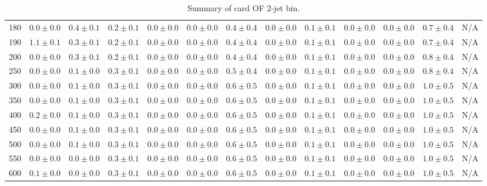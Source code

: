 \begin{table}
{\begin{center}
\begin{tabular}{l | c c | c c c c c c c c  | c c}
180 & $0.0\pm0.0$ & $0.4\pm0.1$ & $0.2\pm0.1$ & $0.0\pm0.0$ & $0.0\pm0.0$ & $0.4\pm0.4$ & $0.0\pm0.0$ & $0.1\pm0.1$ & $0.0\pm0.0$ & $0.0\pm0.0$ & $0.7\pm0.4$ & N/A \\
190 & $1.1\pm0.1$ & $0.3\pm0.1$ & $0.2\pm0.1$ & $0.0\pm0.0$ & $0.0\pm0.0$ & $0.4\pm0.4$ & $0.0\pm0.0$ & $0.1\pm0.1$ & $0.0\pm0.0$ & $0.0\pm0.0$ & $0.7\pm0.4$ & N/A \\
200 & $0.0\pm0.0$ & $0.3\pm0.1$ & $0.2\pm0.1$ & $0.0\pm0.0$ & $0.0\pm0.0$ & $0.4\pm0.4$ & $0.0\pm0.0$ & $0.1\pm0.1$ & $0.0\pm0.0$ & $0.0\pm0.0$ & $0.8\pm0.4$ & N/A \\
250 & $0.0\pm0.0$ & $0.1\pm0.0$ & $0.3\pm0.1$ & $0.0\pm0.0$ & $0.0\pm0.0$ & $0.5\pm0.4$ & $0.0\pm0.0$ & $0.1\pm0.1$ & $0.0\pm0.0$ & $0.0\pm0.0$ & $0.8\pm0.4$ & N/A \\
300 & $0.0\pm0.0$ & $0.1\pm0.0$ & $0.3\pm0.1$ & $0.0\pm0.0$ & $0.0\pm0.0$ & $0.6\pm0.5$ & $0.0\pm0.0$ & $0.1\pm0.1$ & $0.0\pm0.0$ & $0.0\pm0.0$ & $1.0\pm0.5$ & N/A \\
350 & $0.0\pm0.0$ & $0.1\pm0.0$ & $0.3\pm0.1$ & $0.0\pm0.0$ & $0.0\pm0.0$ & $0.6\pm0.5$ & $0.0\pm0.0$ & $0.1\pm0.1$ & $0.0\pm0.0$ & $0.0\pm0.0$ & $1.0\pm0.5$ & N/A \\
400 & $0.2\pm0.0$ & $0.1\pm0.0$ & $0.3\pm0.1$ & $0.0\pm0.0$ & $0.0\pm0.0$ & $0.6\pm0.5$ & $0.0\pm0.0$ & $0.1\pm0.1$ & $0.0\pm0.0$ & $0.0\pm0.0$ & $1.0\pm0.5$ & N/A \\
450 & $0.0\pm0.0$ & $0.1\pm0.0$ & $0.3\pm0.1$ & $0.0\pm0.0$ & $0.0\pm0.0$ & $0.6\pm0.5$ & $0.0\pm0.0$ & $0.1\pm0.1$ & $0.0\pm0.0$ & $0.0\pm0.0$ & $1.0\pm0.5$ & N/A \\
500 & $0.0\pm0.0$ & $0.1\pm0.0$ & $0.3\pm0.1$ & $0.0\pm0.0$ & $0.0\pm0.0$ & $0.6\pm0.5$ & $0.0\pm0.0$ & $0.1\pm0.1$ & $0.0\pm0.0$ & $0.0\pm0.0$ & $1.0\pm0.5$ & N/A \\
550 & $0.0\pm0.0$ & $0.0\pm0.0$ & $0.3\pm0.1$ & $0.0\pm0.0$ & $0.0\pm0.0$ & $0.6\pm0.5$ & $0.0\pm0.0$ & $0.1\pm0.1$ & $0.0\pm0.0$ & $0.0\pm0.0$ & $1.0\pm0.5$ & N/A \\
600 & $0.1\pm0.0$ & $0.0\pm0.0$ & $0.3\pm0.1$ & $0.0\pm0.0$ & $0.0\pm0.0$ & $0.6\pm0.5$ & $0.0\pm0.0$ & $0.1\pm0.1$ & $0.0\pm0.0$ & $0.0\pm0.0$ & $1.0\pm0.5$ & N/A \\
\hline
\end{tabular}
\end{center}
}
\caption{Summary of card OF 2-jet bin.}
\end{table}

